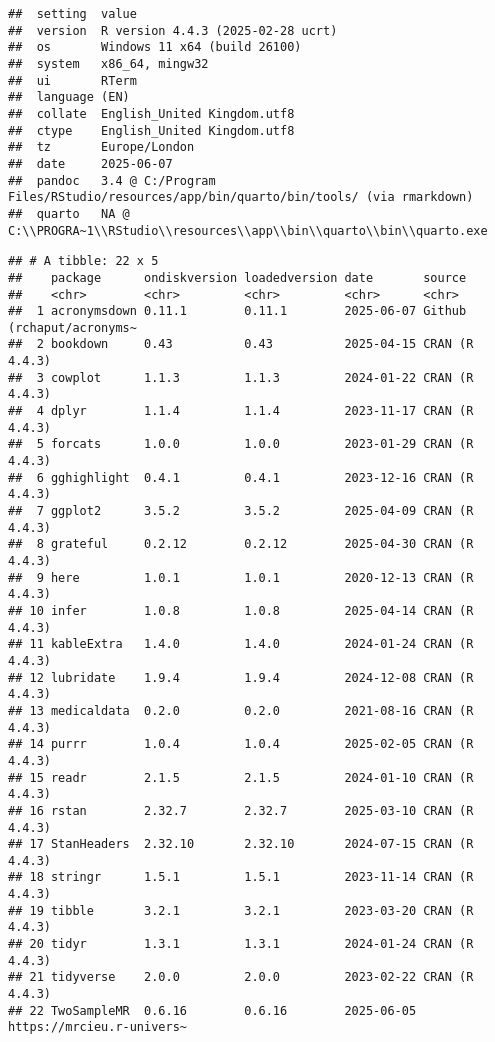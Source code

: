 \documentclass[
]{article}
\begin{document}
\begin{verbatim}
##  setting  value
##  version  R version 4.4.3 (2025-02-28 ucrt)
##  os       Windows 11 x64 (build 26100)
##  system   x86_64, mingw32
##  ui       RTerm
##  language (EN)
##  collate  English_United Kingdom.utf8
##  ctype    English_United Kingdom.utf8
##  tz       Europe/London
##  date     2025-06-07
##  pandoc   3.4 @ C:/Program Files/RStudio/resources/app/bin/quarto/bin/tools/ (via rmarkdown)
##  quarto   NA @ C:\\PROGRA~1\\RStudio\\resources\\app\\bin\\quarto\\bin\\quarto.exe
\end{verbatim}

\begin{verbatim}
## # A tibble: 22 x 5
##    package      ondiskversion loadedversion date       source                   
##    <chr>        <chr>         <chr>         <chr>      <chr>                    
##  1 acronymsdown 0.11.1        0.11.1        2025-06-07 Github (rchaput/acronyms~
##  2 bookdown     0.43          0.43          2025-04-15 CRAN (R 4.4.3)           
##  3 cowplot      1.1.3         1.1.3         2024-01-22 CRAN (R 4.4.3)           
##  4 dplyr        1.1.4         1.1.4         2023-11-17 CRAN (R 4.4.3)           
##  5 forcats      1.0.0         1.0.0         2023-01-29 CRAN (R 4.4.3)           
##  6 gghighlight  0.4.1         0.4.1         2023-12-16 CRAN (R 4.4.3)           
##  7 ggplot2      3.5.2         3.5.2         2025-04-09 CRAN (R 4.4.3)           
##  8 grateful     0.2.12        0.2.12        2025-04-30 CRAN (R 4.4.3)           
##  9 here         1.0.1         1.0.1         2020-12-13 CRAN (R 4.4.3)           
## 10 infer        1.0.8         1.0.8         2025-04-14 CRAN (R 4.4.3)           
## 11 kableExtra   1.4.0         1.4.0         2024-01-24 CRAN (R 4.4.3)           
## 12 lubridate    1.9.4         1.9.4         2024-12-08 CRAN (R 4.4.3)           
## 13 medicaldata  0.2.0         0.2.0         2021-08-16 CRAN (R 4.4.3)           
## 14 purrr        1.0.4         1.0.4         2025-02-05 CRAN (R 4.4.3)           
## 15 readr        2.1.5         2.1.5         2024-01-10 CRAN (R 4.4.3)           
## 16 rstan        2.32.7        2.32.7        2025-03-10 CRAN (R 4.4.3)           
## 17 StanHeaders  2.32.10       2.32.10       2024-07-15 CRAN (R 4.4.3)           
## 18 stringr      1.5.1         1.5.1         2023-11-14 CRAN (R 4.4.3)           
## 19 tibble       3.2.1         3.2.1         2023-03-20 CRAN (R 4.4.3)           
## 20 tidyr        1.3.1         1.3.1         2024-01-24 CRAN (R 4.4.3)           
## 21 tidyverse    2.0.0         2.0.0         2023-02-22 CRAN (R 4.4.3)           
## 22 TwoSampleMR  0.6.16        0.6.16        2025-06-05 https://mrcieu.r-univers~
\end{verbatim}

\newpage
\end{document}
